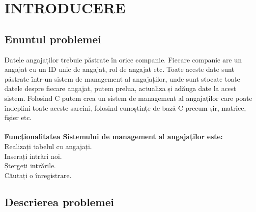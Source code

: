 \documentclass[12pt,a4paper]{article}
\begin{document}
	\tableofcontents

\newpage
\section{INTRODUCERE}
\subsection{Enuntul problemei}
 
Datele angajaților trebuie păstrate în orice companie. Fiecare companie are un angajat cu un ID
unic de angajat, rol de angajat etc. Toate aceste date sunt păstrate într-un sistem de management
al angajaților, unde sunt stocate toate datele despre fiecare angajat, putem prelua, actualiza și
adăuga date la acest sistem. Folosind C putem crea un sistem de management al angajaților care
poate îndeplini toate aceste sarcini, folosind cunoștințe de bază C precum șir, matrice, fișier etc.\\\\
\textbf{Funcționalitatea Sistemului de management al angajaților este:}\\
Realizați tabelul cu angajați.\\
Inserați intrări noi.\\
Ștergeți intrările.\\
Căutați o înregistrare.

\subsection{Descrierea problemei}
\end{document}
